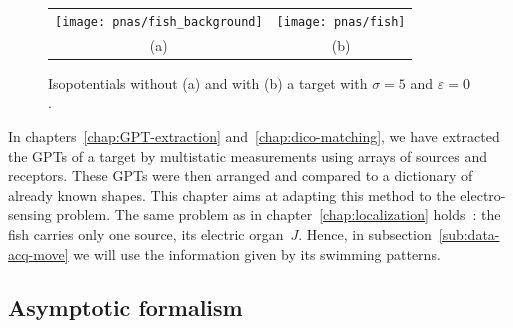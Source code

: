\begin{figure}[!h]
\centering%
\begin{tabular}{cc}
\texttt{[image: pnas/fish\_background]} & \texttt{[image: pnas/fish]}\tabularnewline
(a) & (b)\tabularnewline
\end{tabular}
\caption{\label{figmodel}Isopotentials without (a) and with (b) a
target with $\sigma=5$ and $\varepsilon=0$.}
\end{figure}


In chapters~\ref{chap:GPT-extraction} and~\ref{chap:dico-matching}, we have extracted the GPTs of a
target by multistatic measurements using arrays of sources and
receptors. These GPTs were then arranged and compared to a
dictionary of already known shapes. This chapter aims at adapting
this method to the electro-sensing problem. The same problem as in
chapter~\ref{chap:localization} holds~: the fish carries only one source,
its electric organ~$J$. Hence, in subsection~\ref{sub:data-acq-move} we
will use the information given by its swimming patterns.






\subsection{Asymptotic formalism} \label{sec:reconstruction-GPT}

